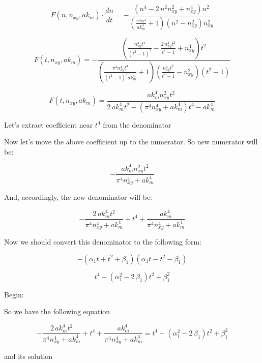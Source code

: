 \documentclass[11pt]{article}
\begin{document}
\[F\left(n, n_{xy}, ak_m\right) \cdot \frac{dn}{dt} = -\frac{{\left(n^{4} - 2 \, n^{2} n_{\mathit{xy}}^{2} + n_{\mathit{xy}}^{4}\right)} n^{2}}{{\left(\frac{\pi^{4} n^{4}}{\mathit{ak}_{m}^{4}} + 1\right)} {\left(n^{2} - n_{\mathit{xy}}^{2}\right)} n_{\mathit{xy}}^{2}}\]

\[F\left(t, n_{xy}, ak_m\right) = -\frac{{\left(\frac{n_{\mathit{xy}}^{4} t^{4}}{{\left(t^{2} - 1\right)}^{2}} - \frac{2 \, n_{\mathit{xy}}^{4} t^{2}}{t^{2} - 1} + n_{\mathit{xy}}^{4}\right)} t^{2}}{{\left(\frac{\pi^{4} n_{\mathit{xy}}^{4} t^{4}}{{\left(t^{2} - 1\right)}^{2} \mathit{ak}_{m}^{4}} + 1\right)} {\left(\frac{n_{\mathit{xy}}^{2} t^{2}}{t^{2} - 1} - n_{\mathit{xy}}^{2}\right)} {\left(t^{2} - 1\right)}}\]

\[F\left(t, n_{xy}, ak_m\right) = \frac{\mathit{ak}_{m}^{4} n_{\mathit{xy}}^{2} t^{2}}{2 \, \mathit{ak}_{m}^{4} t^{2} - {\left(\pi^{4} n_{\mathit{xy}}^{4} + \mathit{ak}_{m}^{4}\right)} t^{4} - \mathit{ak}_{m}^{4}}\]

    Let's extract coefficient near \(t^4\) from the denominator

    Now let's move the above coefficient up to the numerator. So new
numerator will be:

    \[-\frac{\mathit{ak}_{m}^{4} n_{\mathit{xy}}^{2} t^{2}}{\pi^{4} n_{\mathit{xy}}^{4} + \mathit{ak}_{m}^{4}}\]

    And, accordingly, the new denominator will be:

    \[-\frac{2 \, \mathit{ak}_{m}^{4} t^{2}}{\pi^{4} n_{\mathit{xy}}^{4} + \mathit{ak}_{m}^{4}} + t^{4} + \frac{\mathit{ak}_{m}^{4}}{\pi^{4} n_{\mathit{xy}}^{4} + \mathit{ak}_{m}^{4}}\]

    Now we should convert this denominator to the following form:

    \[-{\left(\alpha_{1} t + t^{2} + \beta_{1}\right)} {\left(\alpha_{1} t - t^{2} - \beta_{1}\right)}\]

\[t^{4} - {\left(\alpha_{1}^{2} - 2 \, \beta_{1}\right)} t^{2} + \beta_{1}^{2}\]

    Begin:

    So we have the following equation

\[-\frac{2 \, \mathit{ak}_{m}^{4} t^{2}}{\pi^{4} n_{\mathit{xy}}^{4} + \mathit{ak}_{m}^{4}} + t^{4} + \frac{\mathit{ak}_{m}^{4}}{\pi^{4} n_{\mathit{xy}}^{4} + \mathit{ak}_{m}^{4}} = t^{4} - {\left(\alpha_{1}^{2} - 2 \, \beta_{1}\right)} t^{2} + \beta_{1}^{2}\]

and its solution
\end{document}
